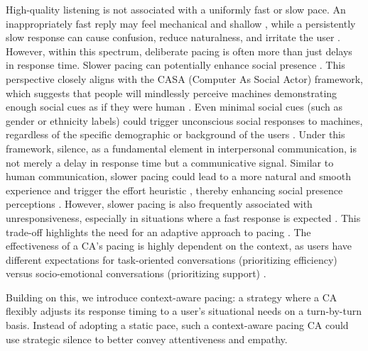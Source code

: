 High-quality listening is not associated with a uniformly fast or slow pace. An inappropriately fast reply may feel mechanical and shallow \cite{gnewuch2022opposing}, while a persistently slow response can cause confusion, reduce naturalness, and irritate the user \cite{levitt2001sounds, 10.1145/3472307.3484181, kum2022can}. 
However, within this spectrum, deliberate pacing is often more than just delays in response time. Slower pacing can potentially enhance social presence \cite{holtgraves2007perceiving, holtgraves2007procedure, gnewuch2022opposing}. This perspective closely aligns with the CASA (Computer As Social Actor) framework, which suggests that people will mindlessly perceive machines demonstrating enough social cues as if they were human \cite{reeves1996media, nass2000machines}. Even minimal social cues (such as gender or ethnicity labels) could trigger unconscious social responses to machines, regardless of the specific demographic or background of the users \cite{nass2000machines}. Under this framework, silence, as a fundamental element in interpersonal communication, is not merely a delay in response time but a communicative signal. Similar to human communication, slower pacing could lead to a more natural and smooth experience \cite{appel2012does} and trigger the effort heuristic \cite{10.1145/3449287, kruger2004effort}, thereby enhancing social presence perceptions \cite{gnewuch2022opposing}.
However, slower pacing is also frequently associated with unresponsiveness, especially in situations where a fast response is expected \cite{gnewuch2022opposing}. 
This trade-off highlights the need for an adaptive approach to pacing \cite{hauptman2025ethical}. The effectiveness of a CA's pacing is highly dependent on the context, as users have different expectations for task-oriented conversations (prioritizing efficiency) versus socio-emotional conversations (prioritizing support) \cite{lim2025proactivity}. 

Building on this, we introduce context-aware pacing: a strategy where a CA flexibly adjusts its response timing to a user's situational needs on a turn-by-turn basis. Instead of adopting a static pace, such a context-aware pacing CA could use strategic silence to better convey attentiveness and empathy. 


